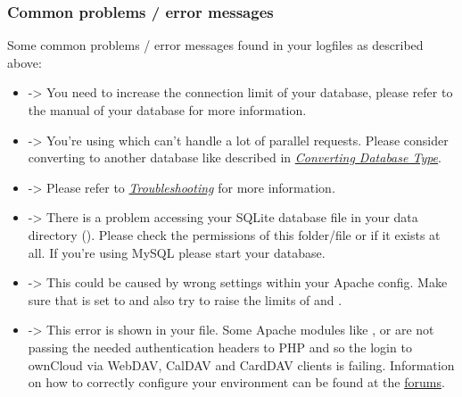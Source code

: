 \documentclass[letterpaper,10pt,english]{sphinxmanual}
\begin{document}
\subsubsection{Common problems / error messages}
\label{issues/general_troubleshooting:common-problems-error-messages}
Some common problems / error messages found in your logfiles as described above:
\begin{itemize}
\item {} 
 -\textgreater{} You need to increase the
connection limit of your database, please refer to the manual of your database
for more information.

\item {} 
 -\textgreater{} You're using
which can't handle a lot of parallel requests. Please consider converting to
another database like described in
{\hyperref[configuration_database/db_conversion::doc]{\emph{\emph{Converting Database Type}}}}.

\item {} 
 -\textgreater{} Please
refer to {\hyperref[configuration_database/linux_database_configuration:db\string-troubleshooting\string-label]{\emph{Troubleshooting}}} for more information.

\item {} 
 -\textgreater{} There is a problem
accessing your SQLite database file in your data directory
(). Please check the permissions of this folder/file or
if it exists at all. If you're using MySQL please start your database.

\item {} 
 -\textgreater{} This could be caused by wrong
 settings within your Apache config. Make sure that
 is set to  and  also try to raise the limits of
 and  .

\item {} 
 -\textgreater{} This error is shown in your
 file. Some Apache modules like , 
or  are not passing the needed authentication headers to
PHP and so the login to ownCloud via WebDAV, CalDAV and CardDAV clients is
failing. Information on how to correctly configure your environment can be
found at the \href{https://central.owncloud.org/t/no-basic-authentication-headers-were-found-message/819}{forums}.

\end{itemize}
\end{document}
